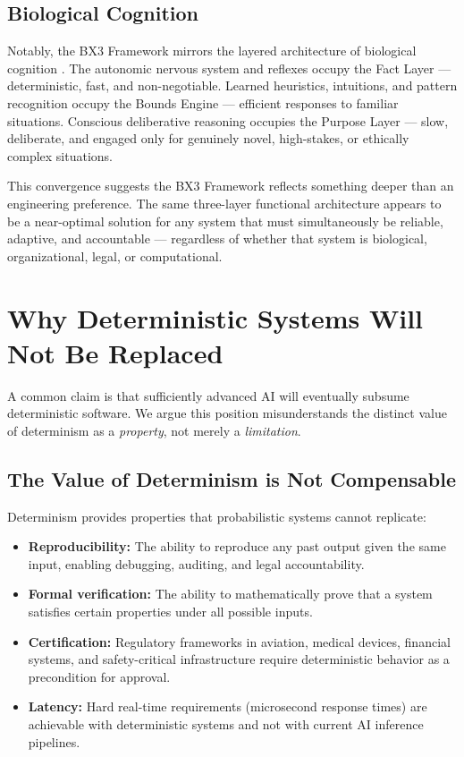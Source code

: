 \documentclass[12pt]{article}
\begin{document}
\subsection{Biological Cognition}

Notably, the BX3 Framework mirrors the layered architecture of biological cognition \cite{kahneman2011}. The autonomic nervous system and reflexes occupy the Fact Layer --- deterministic, fast, and non-negotiable. Learned heuristics, intuitions, and pattern recognition occupy the Bounds Engine --- efficient responses to familiar situations. Conscious deliberative reasoning occupies the Purpose Layer --- slow, deliberate, and engaged only for genuinely novel, high-stakes, or ethically complex situations.

This convergence suggests the BX3 Framework reflects something deeper than an engineering preference. The same three-layer functional architecture appears to be a near-optimal solution for any system that must simultaneously be reliable, adaptive, and accountable --- regardless of whether that system is biological, organizational, legal, or computational.

\section{Why Deterministic Systems Will Not Be Replaced}
\label{sec:determinism}

A common claim is that sufficiently advanced AI will eventually subsume deterministic software. We argue this position misunderstands the distinct value of determinism as a \textit{property}, not merely a \textit{limitation}.

\subsection{The Value of Determinism is Not Compensable}

Determinism provides properties that probabilistic systems cannot replicate:

\begin{itemize}[noitemsep]
    \item \textbf{Reproducibility:} The ability to reproduce any past output given the same input, enabling debugging, auditing, and legal accountability.
    \item \textbf{Formal verification:} The ability to mathematically prove that a system satisfies certain properties under all possible inputs.
    \item \textbf{Certification:} Regulatory frameworks in aviation, medical devices, financial systems, and safety-critical infrastructure require deterministic behavior as a precondition for approval.
    \item \textbf{Latency:} Hard real-time requirements (microsecond response times) are achievable with deterministic systems and not with current AI inference pipelines.
\end{itemize}
\end{document}
